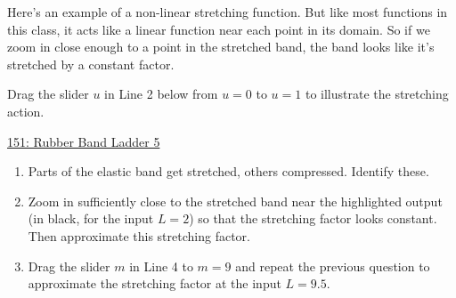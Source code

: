 \documentclass{ximera}
\begin{document}
\begin{example} \label{Ex:JDJFHDtet434t}
Here's an example of a non-linear stretching function. But like most functions in this class, it acts like a linear function near each point in its domain. So if we zoom in close enough to a point in the stretched band, the band looks like it's stretched by a constant factor. 

Drag the slider $u$ in Line 2 below from $u=0$ to $u=1$ to illustrate the stretching action.
\begin{onlineOnly}
    \begin{center}
\end{center}
\end{onlineOnly}

\href{https://www.desmos.com/calculator/uelamyuigg}{151: Rubber Band Ladder 5}

\begin{question} \label{Q:KMndrergvgbg}

\end{question}
\begin{enumerate}
\item Parts of the elastic band get stretched, others compressed. Identify these.

\item Zoom in sufficiently close to the stretched band near the highlighted output (in black, for the input $L=2$) so that the stretching factor looks constant. Then approximate this stretching factor.

\item Drag the slider $m$ in Line 4 to $m=9$ and repeat the previous question to approximate the stretching factor at the input $L=9.5$.
\end{enumerate}
\end{example}
\end{document}
